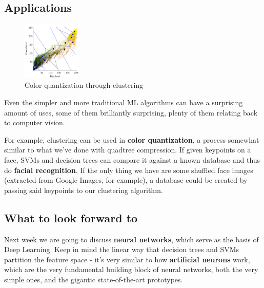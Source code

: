 \documentclass{article}
\begin{document}
\subsection{Applications}
\begin{figure}
  \begin{center}
    \vspace{-45pt}
    \includegraphics[width=0.25\textwidth]{quantization.png}
    \vspace{-30pt}
  \end{center}
  \caption{Color quantization through clustering}
  \vspace{-30pt}
\end{figure}
Even the simpler and more traditional ML algorithms can have a surprising amount of uses, some of them brilliantly surprising, plenty of them relating back to computer vision.

For example, clustering can be used in \textbf{color quantization}, a process somewhat similar to what we've done with quadtree compression. If given keypoints on a face, SVMs and decision trees can compare it against a known database and thus do \textbf{facial recognition}. If the only thing we have are some shuffled face images (extracted from Google Images, for example), a database could be created by passing said keypoints to our clustering algorithm.

\subsection{What to look forward to}
Next week we are going to discuss \textbf{neural networks}, which serve as the basis of Deep Learning. Keep in mind the linear way that decision trees and SVMs partition the feature space - it's very similar to how \textbf{artificial neurons} work, which are the very fundamental building block of neural networks, both the very simple ones, and the gigantic state-of-the-art prototypes.
\end{document}
